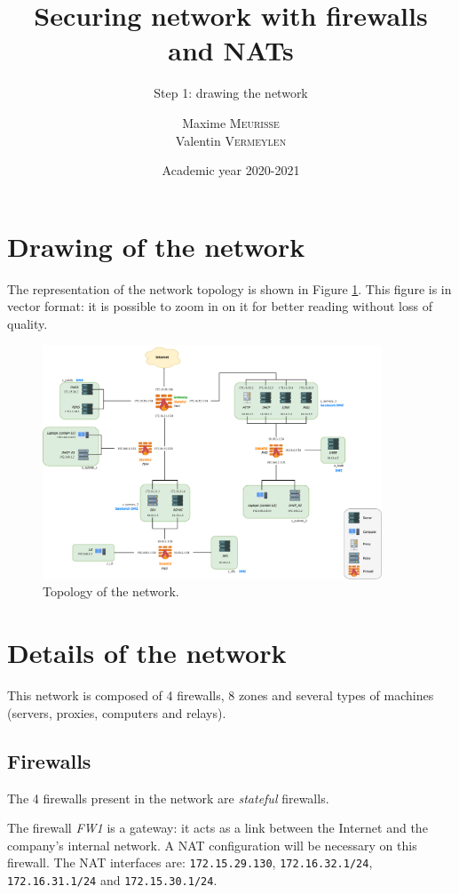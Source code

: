 \documentclass[a4paper, 12pt]{article}
\institute{University of Liège}
\title{Securing network with firewalls and NATs}
\subtitle{Step 1: drawing the network}
\author{Maxime \textsc{Meurisse}\\Valentin \textsc{Vermeylen}}
\date{Academic year 2020-2021}
\begin{document}
	\maketitle
	
	\section{Drawing of the network}
	
	The representation of the network topology is shown in Figure \ref{fig:network.topology}. This figure is in vector format: it is possible to zoom in on it for better reading without loss of quality.
	
	\begin{figure}[H]
	    \centering
	    \includegraphics[width=0.9\textwidth]{resources/pdf/topology.pdf}
	    \caption{Topology of the network.}
	    \label{fig:network.topology}
	\end{figure}
	
	\section{Details of the network}
	
	This network is composed of 4 firewalls, 8 zones and several types of machines (servers, proxies, computers and relays).
	
	\subsection{Firewalls}
	
	The 4 firewalls present in the network are \emph{stateful} firewalls.
	
	The firewall \emph{FW1} is a gateway: it acts as a link between the Internet and the company's internal network. A NAT configuration will be necessary on this firewall. The NAT interfaces are: \texttt{172.15.29.130}, \texttt{172.16.32.1/24}, \texttt{172.16.31.1/24} and \texttt{172.15.30.1/24}.
	
\end{document}

